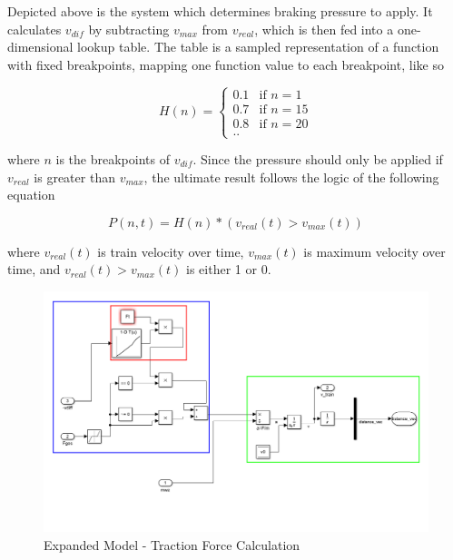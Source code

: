 \par\noindent
Depicted above is the system which determines braking pressure to apply. It calculates $v_{dif}$ by subtracting $v_{max}$ from $v_{real}$, which is then fed into a one-dimensional lookup table. The table is a sampled representation of a function with fixed breakpoints, mapping one function value to each breakpoint, like so

\begin{equation}
\label{eq:lookuptable}
H(n) =
\begin{cases}
0.1 & \text{if $n=1$} \\
0.7 & \text{if $n=15$} \\
0.8 & \text{if $n=20$} \\
\text{..}
\end{cases}
\end{equation}

\noindent
where $n$ is the breakpoints of $v_{dif}$. Since the pressure should only be applied if $v_{real}$ is greater than $v_{max}$, the ultimate result follows the logic of the following equation

\begin{equation}
\label{eq:brakingpressure}
P(n,t) = H(n) * (v_{real}(t) > v_{max}(t))
\end{equation}

\noindent
where $v_{real}(t)$ is train velocity over time, $v_{max}(t)$ is maximum velocity over time, and $v_{real}(t) > v_{max}(t)$ is either 1 or 0.

\begin{figure}[H]
	\centering
	\includegraphics[width=\linewidth]{./pic/expandedmodel_force}
	\caption{Expanded Model - Traction Force Calculation}
	\label{fig:expandedmodel_force}
\end{figure}

